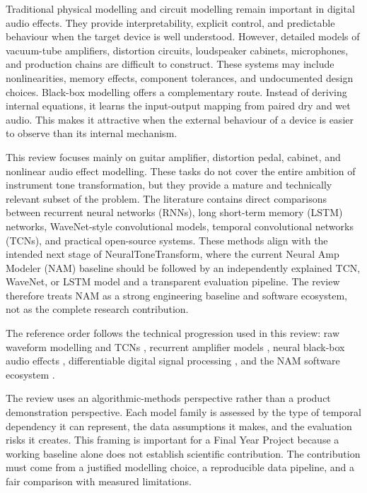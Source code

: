 \documentclass[conference]{IEEEtran}
\begin{document}
Traditional physical modelling and circuit modelling remain important in digital audio effects. They provide interpretability, explicit control, and predictable behaviour when the target device is well understood. However, detailed models of vacuum-tube amplifiers, distortion circuits, loudspeaker cabinets, microphones, and production chains are difficult to construct. These systems may include nonlinearities, memory effects, component tolerances, and undocumented design choices. Black-box modelling offers a complementary route. Instead of deriving internal equations, it learns the input-output mapping from paired dry and wet audio. This makes it attractive when the external behaviour of a device is easier to observe than its internal mechanism.

This review focuses mainly on guitar amplifier, distortion pedal, cabinet, and nonlinear audio effect modelling. These tasks do not cover the entire ambition of instrument tone transformation, but they provide a mature and technically relevant subset of the problem. The literature contains direct comparisons between recurrent neural networks (RNNs), long short-term memory (LSTM) networks, WaveNet-style convolutional models, temporal convolutional networks (TCNs), and practical open-source systems. These methods align with the intended next stage of NeuralToneTransform, where the current Neural Amp Modeler (NAM) baseline should be followed by an independently explained TCN, WaveNet, or LSTM model and a transparent evaluation pipeline. The review therefore treats NAM as a strong engineering baseline and software ecosystem, not as the complete research contribution.

The reference order follows the technical progression used in this review: raw waveform modelling and TCNs \cite{oord2016wavenet,bai2018tcn}, recurrent amplifier models \cite{schmitz2018lstm,wright2019rnn,wright2020guitar}, neural black-box audio effects \cite{ramirez2018nonlinear,ramirez2020blackbox,vanhatalo2022review}, differentiable digital signal processing \cite{engel2020ddsp}, and the NAM software ecosystem \cite{atkinson_nam}.

The review uses an algorithmic-methods perspective rather than a product demonstration perspective. Each model family is assessed by the type of temporal dependency it can represent, the data assumptions it makes, and the evaluation risks it creates. This framing is important for a Final Year Project because a working baseline alone does not establish scientific contribution. The contribution must come from a justified modelling choice, a reproducible data pipeline, and a fair comparison with measured limitations.
\end{document}
